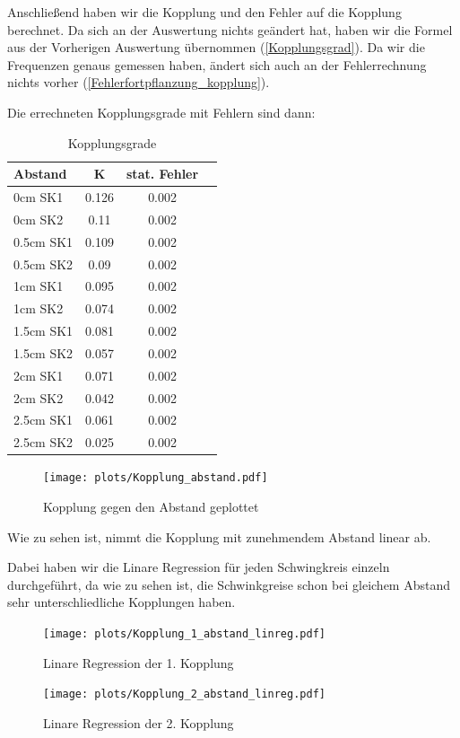 \documentclass[twoside]{protokoll}
\begin{document}
Anschließend haben wir die Kopplung und den Fehler auf die Kopplung berechnet.
Da sich an der Auswertung nichts geändert hat, haben wir die Formel aus der Vorherigen Auswertung übernommen (\ref{Kopplungsgrad}).
Da wir die Frequenzen genaus gemessen haben, ändert sich auch an der Fehlerrechnung nichts vorher (\ref{Fehlerfortpflanzung_kopplung}).

Die errechneten Kopplungsgrade mit Fehlern sind dann:
\begin{table}[H]
        \centering
        \caption{Kopplungsgrade}
        \begin{tabularx}{0.7\textwidth}{X c c c}
            \toprule
            \textbf{Abstand} & \textbf{K} & \textbf{stat. Fehler} \\
            \midrule
            0cm SK1 &  0.126  & 0.002 \\
            0cm SK2 &  0.11  & 0.002 \\
            0.5cm SK1 &  0.109  & 0.002 \\
            0.5cm SK2 &  0.09  & 0.002 \\
            1cm SK1 &  0.095  & 0.002 \\
            1cm SK2 &  0.074  & 0.002 \\
            1.5cm SK1 &  0.081  & 0.002 \\
            1.5cm SK2 &  0.057  & 0.002 \\
            2cm SK1 &  0.071  & 0.002 \\
            2cm SK2 &  0.042  & 0.002 \\
            2.5cm SK1 &  0.061  & 0.002 \\
            2.5cm SK2 &  0.025  & 0.002 \\
            \bottomrule
        \end{tabularx}
        \label{tab:mytable}
\end{table}

\begin{figure}[H]
    \centering
    \texttt{[image: plots/Kopplung\_abstand.pdf]}
    \caption{Kopplung gegen den Abstand geplottet}
\end{figure}
Wie zu sehen ist, nimmt die Kopplung mit zunehmendem Abstand linear ab.

Dabei haben wir die Linare Regression für jeden Schwingkreis einzeln durchgeführt, da wie zu sehen ist, die Schwinkgreise schon bei gleichem Abstand sehr unterschliedliche Kopplungen haben.
 
\begin{figure}[H]
    \centering
    \texttt{[image: plots/Kopplung\_1\_abstand\_linreg.pdf]}
    \caption{Linare Regression der 1. Kopplung}
\end{figure}
\begin{figure}[H]
    \centering
    \texttt{[image: plots/Kopplung\_2\_abstand\_linreg.pdf]}
    \caption{Linare Regression der 2. Kopplung}
\end{figure}
 
\end{document}
